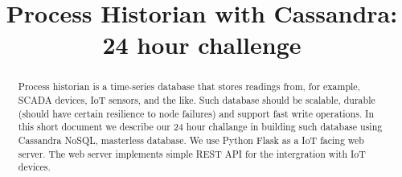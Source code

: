 \documentclass[conference,10pt,letter]{IEEEtran}
\begin{document}
\sloppy
\title{Process Historian with Cassandra: 24 hour challenge}
\maketitle
\begin{abstract}
Process historian is a time-series database that stores readings 
from, for example, SCADA devices, IoT sensors, and the like. 
Such database should be scalable, durable (should have certain 
resilience to node failures) and support fast write operations.
In this short document we describe our 24 hour challange in
building such database using Cassandra NoSQL, masterless database.
We use Python Flask as a IoT facing web server. The web server
implements simple REST API for the intergration with IoT devices.
\end{abstract}

 




\balance


\end{document}
